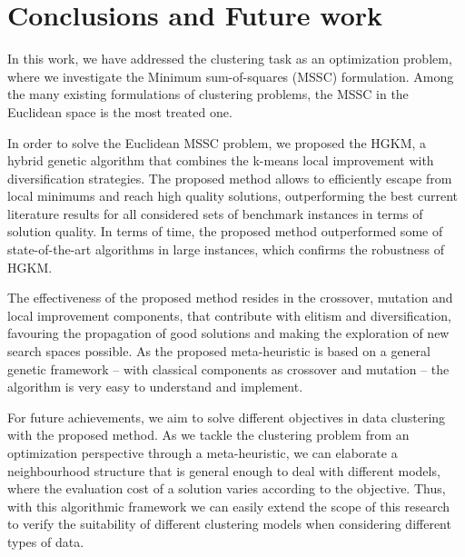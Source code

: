 \chapter{Conclusions and Future work}

In this work, we have addressed the clustering task as an optimization problem, where we investigate the Minimum sum-of-squares (MSSC) formulation. Among the many existing formulations of clustering problems, the MSSC in the Euclidean space is the most treated one.

In order to solve the Euclidean MSSC problem, we proposed the HGKM, a hybrid genetic algorithm that combines the k-means local improvement with diversification strategies. The proposed method allows to efficiently escape from local minimums and reach high quality solutions, outperforming the best current literature results for all considered sets of benchmark instances in terms of solution quality. In terms of time, the proposed method outperformed some of state-of-the-art algorithms in large instances, which confirms the robustness of HGKM.

The effectiveness of the proposed method resides in the crossover, mutation and local improvement components, that contribute with elitism and diversification, favouring the propagation of good solutions and making the exploration of new search spaces possible. As the proposed meta-heuristic is based on a general genetic framework -- with classical components as crossover and mutation -- the algorithm is very easy to understand and implement.

For future achievements, we aim to solve different objectives in data clustering with the proposed method. As we tackle the clustering problem from an optimization perspective through a meta-heuristic, we can elaborate a neighbourhood structure that is general enough to deal with different models, where the evaluation cost of a solution varies according to the objective. Thus, with this algorithmic framework we can easily extend the scope of this research to verify the suitability of different clustering models when considering different types of data.